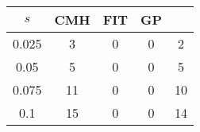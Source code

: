 \centering \begin{tabular}{c|c|c|c|c}
$s$	&CMH	&FIT	&GP	&\sc{Clear} \\\hline
0.025	&3	&0	&0	&2\\
0.05	&5	&0	&0	&5\\
0.075	&11	&0	&0	&10\\
0.1	&15	&0	&0	&14\\
\end{tabular}
